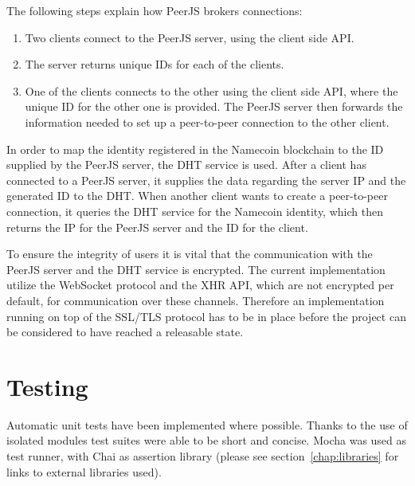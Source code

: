 The following steps explain how PeerJS brokers connections:
\begin{enumerate}
\item Two clients connect to the PeerJS server, using the client side API.
\item The server returns unique IDs for each of the clients.
\item One of the clients connects to the other using the client side API, where the unique ID for the other one is provided. The PeerJS server then forwards the information needed to set up a peer-to-peer connection to the other client.
\end{enumerate}

In order to map the identity registered in the Namecoin blockchain to the ID supplied by the PeerJS server, the DHT service is used. After a client has connected to a PeerJS server, it supplies the data regarding the server IP and the generated ID to the DHT. When another client wants to create a peer-to-peer connection, it queries the DHT service for the Namecoin identity, which then returns the IP for the PeerJS server and the ID for the client.

To ensure the integrity of users it is vital that the communication with the PeerJS server and the DHT service is encrypted. The current implementation utilize the WebSocket protocol and the XHR API, which are not encrypted per default, for communication over these channels. Therefore an implementation running on top of the SSL/TLS protocol has to be in place before the project can be considered to have reached a releasable state.

\section{Testing}
\label{sec:testing}

Automatic unit tests have been implemented where possible. Thanks to the use of isolated modules test suites were able to be short and concise. Mocha was used as test runner, with Chai as assertion library (please see section~\ref{chap:libraries} for links to external libraries used).

